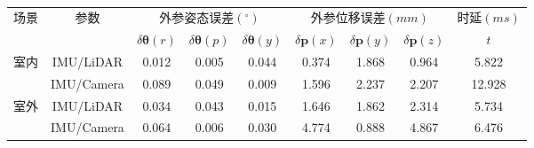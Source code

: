 \begin{table}[]
  \centering
  \normf
  \begin{tabular}{c|c|ccccccc}
    \hline
    \multirow{2}{*}{场景} & \multirow{2}{*}{参数} & \multicolumn{3}{c|}{外参姿态误差$(^\circ)$} & \multicolumn{3}{c|}{外参位移误差$(mm)$} & 时延$(ms)$                                                                                                                                                                    \\ \cline{3-9}
                          &                       & $\delta{\boldsymbol{\theta}(r)}$            & $\delta{\boldsymbol{\theta}(p)}$        & \multicolumn{1}{c|}{$\delta{\boldsymbol{\theta}(y)}$} & $\delta{\boldsymbol{p}(x)}$ & $\delta{\boldsymbol{p}(y)}$ & \multicolumn{1}{c|}{$\delta{\boldsymbol{p}(z)}$} & $ t$   \\ \hline
    \multirow{2}{*}{室内} & IMU/LiDAR             & 0.012                                       & 0.005                                   & 0.044                                                 & 0.374                       & 1.868                       & 0.964                                            & 5.822  \\
                          & IMU/Camera            & 0.089                                       & 0.049                                   & 0.009                                                 & 1.596                       & 2.237                       & 2.207                                            & 12.928 \\ \hline
    \multirow{2}{*}{室外} & IMU/LiDAR             & 0.034                                       & 0.043                                   & 0.015                                                 & 1.646                       & 1.862                       & 2.314                                            & 5.734  \\
                          & IMU/Camera            & 0.064                                       & 0.006                                   & 0.030                                                 & 4.774                       & 0.888                       & 4.867                                            & 6.476  \\ \hline
  \end{tabular}
  \caption{}
  \label{tab:real_world_statistic}
\end{table}

